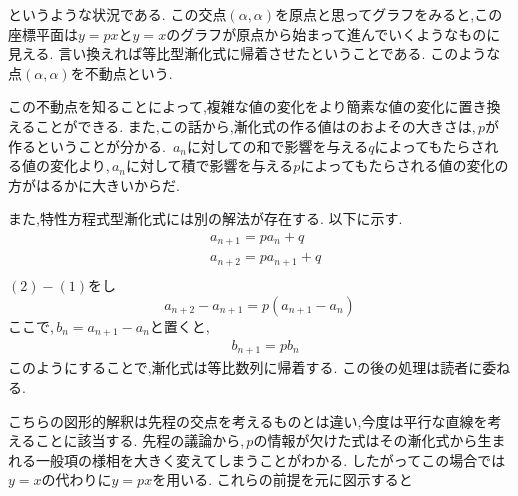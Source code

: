 
  というような状況である.
  この交点$(\alpha,\alpha)$を原点と思ってグラフをみると,この座標平面は$y=px$と$y=x$のグラフが原点から始まって進んでいくようなものに見える.
  言い換えれば等比型漸化式に帰着させたということである.
  このような点$(\alpha,\alpha)$を不動点という.

  この不動点を知ることによって,複雑な値の変化をより簡素な値の変化に置き換えることができる.
  また,この話から,漸化式の作る値はのおよその大きさは,\,$p$が作るということが分かる.
  \,$a_n$に対しての和で影響を与える$q$によってもたらされる値の変化より,\,$a_n$に対して積で影響を与える$p$によってもたらされる値の変化の方がはるかに大きいからだ.

  また,特性方程式型漸化式には別の解法が存在する.
  以下に示す.
  \begin{align*}
    &a_{n+1}=pa_n+q \tag*{\(\cdots\) (1)}\\
    &a_{n+2}=pa_{n+1}+q \tag*{\(\cdots\) (2)}\\
  \end{align*}
  $(2)-(1)$をし
  \[
    a_{n+2}-a_{n+1}=p(a_{n+1}-a_n)
  \]
  ここで,\,$b_n=a_{n+1}-a_n$と置くと,
  \begin{align*}
    &b_{n+1}=pb_n
  \end{align*}
  このようにすることで,漸化式は等比数列に帰着する.
  この後の処理は読者に委ねる.

  こちらの図形的解釈は先程の交点を考えるものとは違い,今度は平行な直線を考えることに該当する.
  先程の議論から,\,$p$の情報が欠けた式はその漸化式から生まれる一般項の様相を大きく変えてしまうことがわかる.
  したがってこの場合では$y=x$の代わりに$y=px$を用いる.
  これらの前提を元に図示すると

